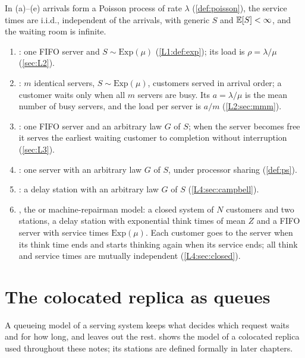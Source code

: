 \begin{definition}\label{L1:def:queues}
In (a)--(e) arrivals form a Poisson process of rate $\lambda$ (\cref{def:poisson}),
the service times are i.i.d., independent of the arrivals, with generic $S$ and
$\mathbb{E}[S]<\infty$, and the waiting room is infinite.
\begin{enumerate}[label=(\alph*)]
\item {}: one FIFO server and $S\sim\mathrm{Exp}(\mu)$ (\cref{L1:def:exp});
  its load is $\rho=\lambda/\mu$ (\cref{sec:L2}).
\item {}: $m$ identical servers, $S\sim\mathrm{Exp}(\mu)$, customers served
  in arrival order; a customer waits only when all $m$ servers are busy. Its
   $a=\lambda/\mu$ is the mean number of busy servers, and the load
  per server is $a/m$ (\cref{L2:sec:mmm}).
\item {}: one FIFO server and an arbitrary law $G$ of $S$; when the server
  becomes free it serves the earliest waiting customer to completion without
  interruption (\cref{sec:L3}).
\item {}: one server with an arbitrary law $G$ of $S$, under processor
  sharing (\cref{def:ps}).
\item {}: a delay station with an arbitrary law $G$ of $S$
  (\cref{L4:sec:campbell}).
\item {}, the  or machine-repairman model: a closed
  system of $N$ customers and two stations, a delay station with exponential think
  times of mean $Z$ and a FIFO server with service times $\mathrm{Exp}(\mu)$. Each
  customer goes to the server when its think time ends and starts thinking again when
  its service ends; all think and service times are mutually independent
  (\cref{L4:sec:closed}).
\end{enumerate}
\end{definition}

\section{The colocated replica as queues}\label{L1:sec:projection}

A queueing model of a serving system keeps what decides which request waits and for
how long, and leaves out the rest.  shows the model of a colocated
replica used throughout these notes; its stations are defined formally in later chapters.


